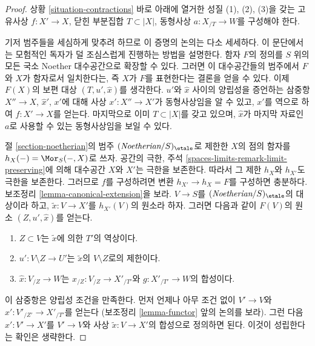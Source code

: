 \begin{proof}
상황 \ref{situation-contractions} 바로 아래에 열거한 성질 (1), (2), (3)을
갖는 고유사상 $f : X' \to X$, 닫힌 부분집합 $T \subset |X|$,
동형사상 $a : X_{/T} \to W$를 구성해야 한다.

\medskip\noindent
기저 범주들을 세심하게 맞추려 하므로 이 증명의 논의는 다소 세세하다.
이 문단에서는 모험적인 독자가 덜 조심스럽게 진행하는 방법을 설명한다.
함자 $F$의 정의를 $S$ 위의 모든 국소 Noether 대수공간으로 확장할 수 있다.
그러면 이 대수공간들의 범주에서 $F$와 $X$가 함자로서 일치한다는,
즉 $X$가 $F$를 표현한다는 결론을 얻을 수 있다.
이제 $F(X)$의 보편 대상 $(T, u', \hat x)$를 생각한다.
$u'$와 $\hat x$ 사이의 양립성을 증언하는 삼중항
$X'' \to X$, $\hat x'$, $x'$에 대해 사상 $x' : X'' \to X'$가
동형사상임을 알 수 있고, $x'$를 역으로 하여 $f : X' \to X$를 얻는다.
마지막으로 이미 $T \subset |X|$를 갖고 있으며,
$\hat x$가 마지막 자료인 $a$로 사용할 수 있는 동형사상임을 보일 수 있다.

\medskip\noindent
절 \ref{section-noetherian}의 범주 $(\textit{Noetherian}/S)_\etale$로
제한한 $X$의 점의 함자를 $h_X(-) = \Mor_S(-, X)$로 쓰자.
공간의 극한, 주석 \ref{spaces-limits-remark-limit-preserving}에 의해
대수공간 $X$와 $X'$는 극한을 보존한다.
따라서 그 제한 $h_X$와 $h_{X'}$도 극한을 보존한다.
그러므로 $f$를 구성하려면 변환 $h_{X'} \to h_X = F$를 구성하면 충분하다.
보조정리 \ref{lemma-canonical-extension}을 보라.
$V \to S$를 $(\textit{Noetherian}/S)_\etale$의 대상이라 하고,
$\tilde x : V \to X'$를 $h_{X'}(V)$의 원소라 하자.
그러면 다음과 같이 $F(V)$의 원소 $(Z, u', \hat x)$를 얻는다.
\begin{enumerate}
\item $Z \subset V$는 $\tilde x$에 의한 $T'$의 역상이다.
\item $u' : V \setminus Z \to U'$는 $\tilde x$의 $V \setminus Z$로의 제한이다.
\item $\hat x : V_{/Z} \to W$는
$x_{/Z} : V_{/Z} \to X'_{/T'}$와 $g : X'_{/T'} \to W$의 합성이다.
\end{enumerate}
이 삼중항은 양립성 조건을 만족한다. 먼저 언제나 아무 조건 없이
$V' \to V$와
$\hat x' : V'_{/Z'} \to X'_{/T'}$를 얻는다
(보조정리 \ref{lemma-functor} 앞의 논의를 보라).
그런 다음 $x' : V' \to X'$를 $V' \to V$와 사상
$\tilde x : V \to X'$의 합성으로 정의하면 된다. 이것이 성립한다는 확인은 생략한다.


\end{proof}
